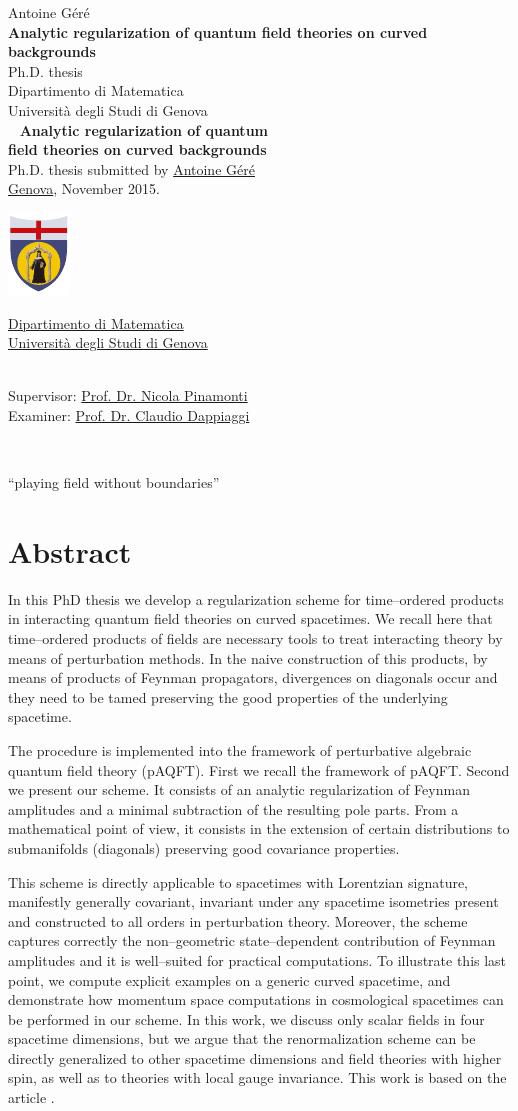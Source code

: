 \documentclass[11pt]{book}
\makeatletter
\newcommand*{\makepagetitle}{%
%
{\raggedright%
%
%
%
%
\thispagestyle{empty}%
%
\vspace*{50pt}
%
{\Large Antoine Géré}\\%
%
\vspace*{120pt}%
%
{\Huge\bfseries Analytic regularization of quantum field theories on curved backgrounds}\\[\baselineskip]%
%
\vspace*{60pt}%
%
{\Large Ph.D. thesis}\\[\baselineskip]%
%
\vspace*{80pt}%
%
{\Large Dipartimento di Matematica}\\[\baselineskip]%
%
\vspace*{1pt}
%
{\Large Università degli Studi di Genova}\\[\baselineskip]%
%
\vfill%
%
%
\newpage%
%
\thispagestyle{empty}%
%
\ \vfill%
%
%
\textbf{Analytic regularization of quantum \\ field theories on curved backgrounds} \\[2pt]
Ph.D. thesis submitted by \href{mailto:gere@dima.unige.it}{Antoine Géré} \\[1pt]
\href{http://www.comune.genova.it/}{Genova}, November 2015. \\[10pt]
%
%
\begin{minipage}{0.1\linewidth}
\includegraphics[scale=1]{unige.pdf}
\end{minipage}
%
\begin{minipage}{0.85\linewidth}
\href{http://www.dima.unige.it/}{Dipartimento di Matematica} \\[1pt]
\href{http://www.unige.it/}{Università degli Studi di Genova}
\end{minipage}
%
%
\vspace*{10pt} \\
Supervisor: \href{mailto:pinamont@dima.unige.it}{Prof. Dr. Nicola Pinamonti} \\[1pt]
%
Examiner: \href{mailto:claudio.dappiaggi@unipv.it}{Prof. Dr. Claudio Dappiaggi}
%
%
%
%
}%
%
}%
\theoremstyle{break}
\makeatother
\begin{document}


\makepagetitle




\newpage
\ \vfill


\begin{flushright}
``playing field without boundaries''
\end{flushright}


\vfill


\newpage
\vspace*{100pt}
\section*{Abstract}


In this PhD thesis we develop a regularization scheme for time--ordered products in interacting quantum field theories on curved spacetimes. We recall here that time--ordered products of fields are necessary tools to treat interacting theory by means of perturbation methods. In the naive construction of this products, by means of products of Feynman propagators, divergences on diagonals occur and they need to be tamed preserving the good properties of the underlying spacetime.


The procedure is implemented into the framework of perturbative algebraic quantum field theory (pAQFT). First we recall the framework of pAQFT. Second we present our scheme. It consists of an analytic regularization of Feynman amplitudes and a minimal subtraction of the resulting pole parts. From a mathematical point of view, it consists in the extension of certain distributions to submanifolds (diagonals) preserving good covariance properties.


This scheme is directly applicable to spacetimes with Lorentzian signature, manifestly generally covariant, invariant under any spacetime isometries present and constructed to all orders in perturbation theory. Moreover, the scheme captures correctly the non--geometric state--dependent contribution of Feynman amplitudes and it is well--suited for practical computations. To illustrate this last point, we compute explicit examples on a generic curved spacetime, and demonstrate how momentum space computations in cosmological spacetimes can be performed in our scheme. In this work, we discuss only scalar fields in four spacetime dimensions, but we argue that the renormalization scheme can be directly generalized to other spacetime dimensions and field theories with higher spin, as well as to theories with local gauge invariance. This work is based on the article \cite{GHP_2015}.
\end{document}
